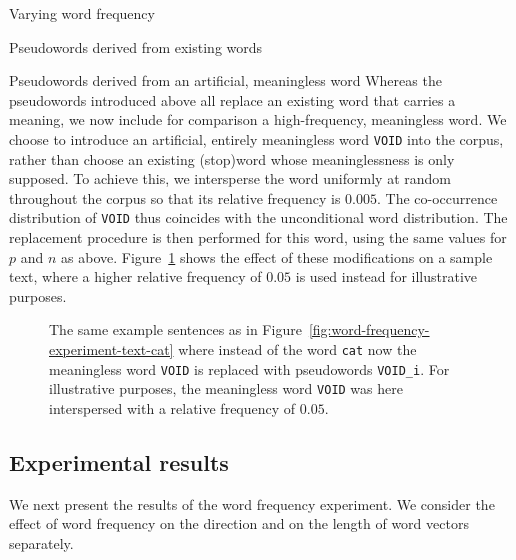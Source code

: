 \documentclass{article} %
\newcommand{\word}[1]{\texttt{#1}}
\begin{document}
\begin{section}{Varying word frequency}
\begin{subsection}{Pseudowords derived from existing words}
\end{subsection}

\begin{subsection}{Pseudowords derived from an artificial, meaningless word}
\label{WFVEmeaningless}
Whereas the pseudowords introduced above all replace an existing word that
carries a meaning, we now include for comparison a high-frequency,
meaningless word.  We choose to introduce an artificial, entirely
meaningless word \word{VOID} into the corpus, rather than choose an
existing (stop)word whose meaninglessness is only supposed.  To achieve
this, we intersperse the word uniformly at random throughout the corpus
so that its relative frequency is $0.005$.  The co-occurrence
distribution of \word{VOID} thus coincides with the unconditional word
distribution.  The replacement procedure is then performed for this
word, using the same values for $p$ and $n$ as above.
Figure~\ref{fig:word-frequency-experiment-text-void} shows the effect of
these modifications on a sample text, where a higher relative frequency
of $0.05$ is used instead for illustrative purposes.

\begin{figure}
	\begin{mdframed}
	
	\end{mdframed}
	\caption{The same example sentences as in
          Figure~\ref{fig:word-frequency-experiment-text-cat} where
          instead of the word \word{cat} now the meaningless word
          \word{VOID} is replaced with pseudowords \word{VOID\_i}.  For
          illustrative purposes, the meaningless word \word{VOID} was
          here interspersed with a relative frequency of
          $0.05$. }
	\label{fig:word-frequency-experiment-text-void}
\end{figure}
\end{subsection}



\subsection{Experimental results}\label{WFVE-results}
We next present the results of the word frequency experiment. We
consider the effect of word frequency on the direction and on the length
of word vectors separately.


\end{section}
\end{document}
